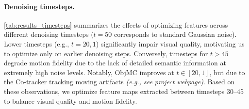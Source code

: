\paragraph{Denoising timesteps.}
\cref{tab:results_timesteps} summarizes the effects of optimizing features across different denoising timesteps ($t=50$ corresponds to standard Gaussian noise).
Lower timesteps (e.g., $t=20,1$) significantly impair visual quality, motivating us to optimize only on earlier denoising steps.
Conversely, timesteps for  $t>45$ degrade motion fidelity due to the lack of detailed semantic information at extremely high noise levels.
Notably, ObjMC improves at $t \in [20, 1]$, but due to the Co-tracker tracking moving artifacts \href{https://kmcode1.github.io/Projects/SG-I2V/gallery_timestep2.html}{\textit{(e.g., see project webpage)}}.
Based on these observations, we optimize feature maps extracted between timesteps 30--45 to balance visual quality and motion fidelity.


